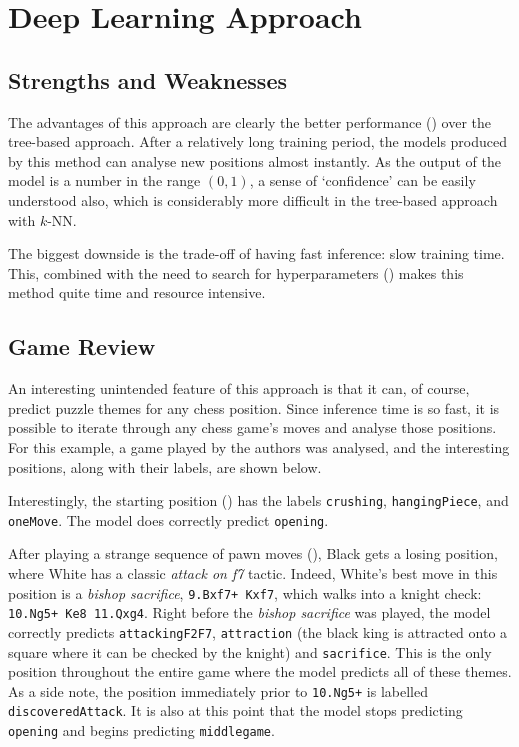 \section{Deep Learning Approach}\label{evalS3}

\subsection{Strengths and Weaknesses}\label{evalS31}

The advantages of this approach are clearly the better performance
() over the tree-based approach. After a relatively long
training period, the models produced by this method can analyse new positions
almost instantly. As the output of the model is a number in the range $(0, 1)$,
a sense of `confidence' can be easily understood also, which is considerably
more difficult in the tree-based approach with $k$-NN.

The biggest downside is the trade-off of having fast inference: slow training
time. This, combined with the need to search for hyperparameters ()
makes this method quite time and resource intensive. 

\subsection{Game Review}\label{evalS32}

An interesting unintended feature of this approach is that it can, of course,
predict puzzle themes for any chess position. Since inference time is so fast,
it is possible to iterate through any chess game's moves and analyse those
positions. For this example, a game played by the authors was analysed, and the
interesting positions, along with their labels, are shown below.

Interestingly, the starting position () has the labels
\texttt{crushing}, \texttt{hangingPiece}, and \texttt{oneMove}. The model does
correctly predict \texttt{opening}. 

After playing a strange sequence of pawn moves (), Black gets a
losing position, where White has a classic \emph{attack on f7} tactic. Indeed,
White's best move in this position is a \emph{bishop sacrifice},
\texttt{9.Bxf7+ Kxf7}, which walks into a knight check: \texttt{10.Ng5+ Ke8
11.Qxg4}. Right before the \emph{bishop sacrifice} was played, the model
correctly predicts \texttt{attackingF2F7}, \texttt{attraction} (the black king
is attracted onto a square where it can be checked by the knight) and
\texttt{sacrifice}. This is the only position throughout the entire game where
the model predicts all of these themes. As a side note, the position
immediately prior to \texttt{10.Ng5+} is labelled \texttt{discoveredAttack}. It
is also at this point that the model stops predicting \texttt{opening} and
begins predicting \texttt{middlegame}.


